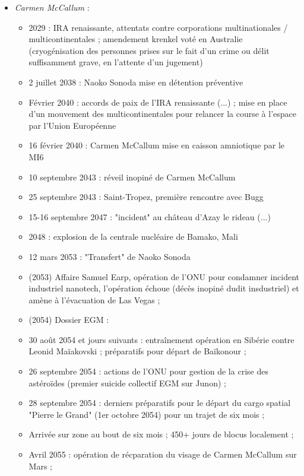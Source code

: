 \documentclass[11pt,twoside,a4paper]{article}
\begin{document}
\begin{multicols*}{2}
\begin{itemize}
	\item \emph{Carmen McCallum} :
	\begin{itemize}
		\item 2029 : IRA renaissante, attentats contre corporations multinationales / multicontinentales ; amendement krenkel vot{\'e} en Australie (cryog{\'e}nisation des personnes prises sur le fait d'un crime ou d{\'e}lit suffisamment grave, en l'attente d'un jugement)
		\item 2 juillet 2038 : Naoko Sonoda mise en d{\'e}tention pr{\'e}ventive
		\item F{\'e}vrier 2040 : accords de paix de l'IRA renaissante (...) ; mise en place d'un mouvement des multicontinentales pour relancer la course {\`a} l'espace par l'Union Europ{\'e}enne
		\item 16 f{\'e}vrier 2040 : Carmen McCallum mise en caisson amniotique par le MI6
		\item 10 septembre 2043 : r{\'e}veil inopin{\'e} de Carmen McCallum
		\item 25 septembre 2043 : Saint-Tropez, premi{\`e}re rencontre avec Bugg
		\item 15-16 septembre 2047 : "incident" au ch{\^a}teau d'Azay le rideau (...)
		\item 2048 : explosion de la centrale nucl{\'e}aire de Bamako, Mali
		\item 12 mars 2053 : "Transfert" de Naoko Sonoda
		\item (2053) Affaire Samuel Earp, op{\'e}ration de l'ONU pour condamner incident industriel nanotech, l'op{\'e}ration {\'e}choue (d{\'e}c{\`e}s inopin{\'e} dudit insdustriel) et am{\`e}ne {\`a} l'{\'e}vacuation de Las Vegas ; 
		\item (2054) Dossier EGM : 
		\item 30 ao{\^u}t 2054 et jours suivants : entra{\^i}nement op{\'e}ration en Sib{\'e}rie contre Leonid Ma{\"i}akovski ; pr{\'e}paratifs pour d{\'e}part de Ba{\"i}konour ;
		\item 26 septembre 2054 : actions de l'ONU pour gestion de la crise des ast{\'e}ro{\"i}des (premier suicide collectif EGM sur Junon) ; 
		\item 28 septembre 2054 : derniers pr{\'e}paratifs pour le d{\'e}part du cargo spatial "Pierre le Grand" (1er octobre 2054) pour un trajet de six mois ; 
		\item Arriv{\'e}e sur zone au bout de six mois ; 450+ jours de blocus localement ; 
		\item Avril 2055 : op{\'e}ration de r{\'e}cparation du visage de Carmen McCallum sur Mars ; 

\end{itemize}
\end{itemize}
\end{multicols*}
\end{document}
